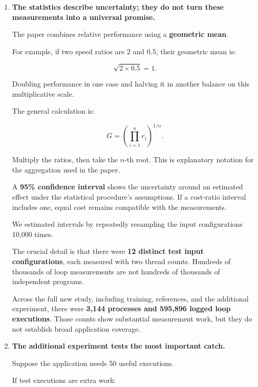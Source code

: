 \documentclass[11pt,a4paper]{article}
\begin{document}
\begin{enumerate}
  Because Full 12's short search also sometimes picks a scheduler that looks good in its trial measurements but performs less well afterward. Full 12 itself had an 11.4\% aggregate penalty against the independent reference.

  \textbf{Do not describe Guided 4 as ``10.2\% slower than exhaustive search.''} The 10.2\% is against a different reference.
\item
  \textbf{The statistics describe uncertainty; they do not turn these measurements into a universal promise.}

  The paper combines relative performance using a \textbf{geometric mean}.

  For example, if two speed ratios are 2 and 0.5, their geometric mean is:

  \[
  \sqrt{2\times0.5}=1.
  \]

  Doubling performance in one case and halving it in another balance on this multiplicative scale.

  The general calculation is:

  \[
  G=\left(\prod_{i=1}^{n}r_i\right)^{1/n}.
  \]

  Multiply the ratios, then take the \(n\)-th root. This is explanatory notation for the aggregation used in the paper.

  A \textbf{95\% confidence interval} shows the uncertainty around an estimated effect under the statistical procedure's assumptions. If a cost-ratio interval includes one, equal cost remains compatible with the measurements.

  We estimated intervals by repeatedly resampling the input configurations 10,000 times.

  The crucial detail is that there were \textbf{12 distinct test input configurations}, each measured with two thread counts. Hundreds of thousands of loop measurements are not hundreds of thousands of independent programs.

  Across the full new study, including training, references, and the additional experiment, there were \textbf{3,144 processes and 595,896 logged loop executions}. Those counts show substantial measurement work, but they do not establish broad application coverage.
\item
  \textbf{The additional experiment tests the most important catch.}

  Suppose the application needs 50 useful executions.

  If test executions are extra work:


\end{enumerate}
\end{document}
